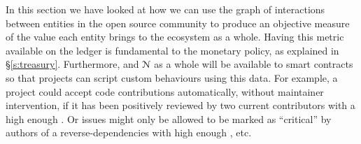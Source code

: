 In this section we have looked at how we can use the graph of interactions
between entities in the open source community to produce an objective measure of
the value each entity brings to the ecosystem as a whole. Having this metric
available on the ledger is fundamental to the \oscoin{} monetary policy, as
explained in \S \ref{s:treasury}. Furthermore, \osrank{} and $\mathcal{N}$ as a
whole will be available to smart contracts so that projects can script custom
behaviours using this data. For example, a project could accept code
contributions automatically, without maintainer intervention, if it has been
positively reviewed by two current contributors with a high enough \osrank{}. Or
issues might only be allowed to be marked as ``critical'' by authors of a
reverse-dependencies with high enough \osrank{}, etc.
